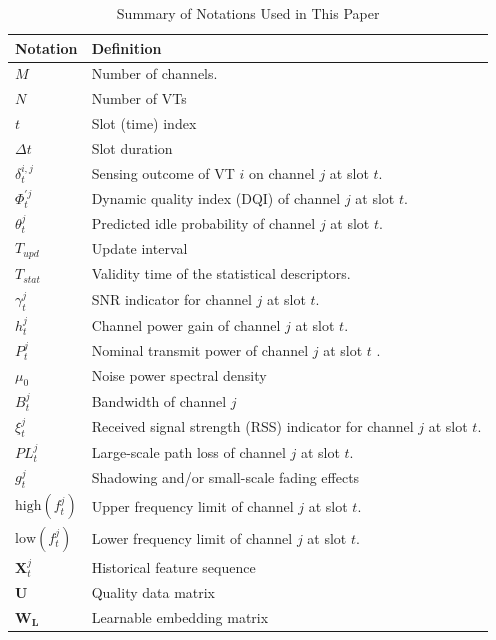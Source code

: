 \documentclass[journal]{IEEEtran}
\begin{document}
\begin{table}[t]
\centering
\caption{Summary of Notations Used in This Paper}
\label{tab:notations}
\renewcommand{\arraystretch}{1.1}
\setlength{\tabcolsep}{6pt}
\begin{tabular}{|p{}|p{}|}
\hline
\textbf{Notation} & \textbf{Definition} \\ \hline
$M$ & Number of channels. \\ \hline
$N$ & Number of VTs \\ \hline
$t$ & Slot (time) index \\ \hline
$\Delta t$ & Slot duration \\ \hline
$\delta_t^{i,j}$ & Sensing outcome of VT $i$ on channel $j$ at slot $t$. \\ \hline
$\Phi_t^{\prime j}$ & Dynamic quality index (DQI) of channel $j$ at slot $t$. \\ \hline
$\theta_t^{j}$ & Predicted idle probability of channel $j$ at slot $t$. \\ \hline
$T_{upd}$ & Update interval\\ \hline
$T_{stat}$ & Validity time of the statistical descriptors.\\ \hline
$\gamma_t^{j}$  & SNR indicator for channel $j$ at slot $t$.\\ \hline
$h_t^{j}$    &Channel power gain of channel $j$ at slot $t$.\\ \hline
$P_t^{j}$    &Nominal transmit power of channel $j$ at slot $t$ .\\ \hline
$\mu_0$      &Noise power spectral density\\ \hline
$B_t^{j}$    &Bandwidth of channel $j$  \\ \hline
$\xi_t^{j}$  &Received signal strength (RSS) indicator for channel $j$ at slot $t$.\\ \hline
$PL_t^{j}$   &Large-scale path loss of channel $j$ at slot $t$. \\ \hline
$g_t^{j}$    &Shadowing and/or small-scale fading effects\\ \hline
$\mathrm{high}(f_t^{j})$ & Upper frequency limit of channel $j$ at slot $t$.\\ \hline
$\mathrm{low}(f_t^{j})$ & Lower frequency limit of channel $j$ at slot $t$.\\ \hline
$\mathbf{X}_t^{j}$    & Historical feature sequence \\ \hline
$\mathbf{U}$          & Quality data matrix  \\ \hline
$\mathbf{W_L}$       & Learnable embedding matrix  \\ \hline

\end{tabular}
\end{table}
\end{document}
